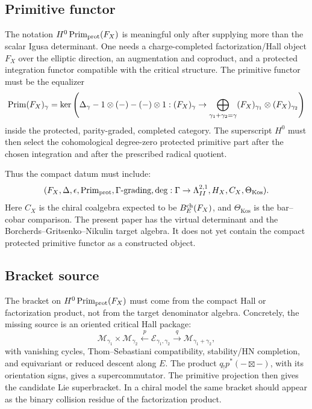 \subsection{Primitive functor}

The notation \(H^0\operatorname{Prim}_{\mathrm{prot}}(F_X)\) is meaningful only after supplying more
than the scalar Igusa determinant.  One needs a charge-completed
factorization/Hall object \(F_X\) over the elliptic direction, an augmentation
and coproduct, and a protected integration functor compatible with the
critical structure.  The primitive functor must be the equalizer
\[
   \operatorname{Prim}(F_X)_\gamma
   =
   \ker\left(
      \Delta_\gamma -
      1\otimes(-)-(-)\otimes1:
      (F_X)_\gamma\to
      \bigoplus_{\gamma_1+\gamma_2=\gamma}(F_X)_{\gamma_1}\otimes(F_X)_{\gamma_2}
   \right)
\]
inside the protected, parity-graded, completed category.  The superscript
\(H^0\) must then select the cohomological degree-zero protected primitive
part after the chosen integration and after the prescribed radical quotient.

Thus the compact datum must include:
\[
   (F_X,\Delta,\epsilon,\operatorname{Prim}_{\mathrm{prot}},\Gamma\text{-grading},\deg:\Gamma\to
   \Lambda^{2,1}_{II},H_X,C_X,\Theta_{\operatorname{Kos}}).
\]
Here \(C_X\) is the chiral coalgebra expected to be
\(B^{\operatorname{ch}}_E(F_X)\), and \(\Theta_{\operatorname{Kos}}\) is the bar--cobar
comparison.  The present paper has the virtual determinant and the
Borcherds--Gritsenko--Nikulin target algebra.  It does not yet contain the
compact protected primitive functor as a constructed object.

\subsection{Bracket source}

The bracket on \(H^0\operatorname{Prim}_{\mathrm{prot}}(F_X)\) must come from the compact Hall or
factorization product, not from the target denominator algebra.  Concretely,
the missing source is an oriented critical Hall package:
\[
   \mathcal M_{\gamma_1}\times \mathcal M_{\gamma_2}
   \xleftarrow{\ p\ }
   \mathcal E_{\gamma_1,\gamma_2}
   \xrightarrow{\ q\ }
   \mathcal M_{\gamma_1+\gamma_2},
\]
with vanishing cycles, Thom--Sebastiani compatibility, stability/HN
completion, and equivariant or reduced descent along \(E\).  The product
\(q_!p^*(-\boxtimes-)\), with its orientation signs, gives a
supercommutator.  The primitive projection then gives the candidate Lie
superbracket.  In a chiral model the same bracket should appear as the
binary collision residue of the factorization product.

